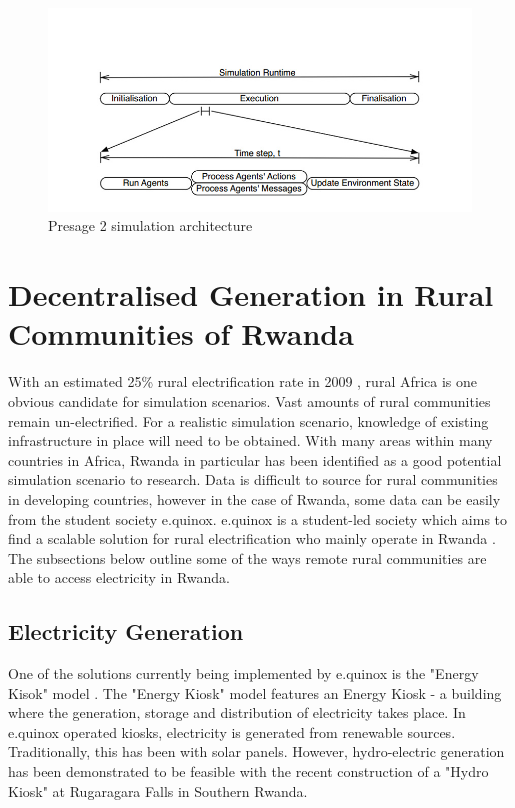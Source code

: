 \begin{figure}[h!]
	\centering
	\includegraphics[scale=0.4]{Images/Presage2.jpg}
	\caption{Presage 2 simulation architecture \cite{Presage_Kyoto:2015}}
	\label{fig:Presage_sim_architecture}
\end{figure}

\clearpage

\section*{Decentralised Generation in Rural Communities of Rwanda}
With an estimated 25\% rural electrification rate in 2009 \cite{IEA-web:2015}, rural Africa is one obvious candidate for simulation scenarios. Vast amounts of rural communities remain un-electrified. For a realistic simulation scenario, knowledge of existing infrastructure in place will need to be obtained. With many areas within many countries in Africa, Rwanda in particular has been identified as a good potential simulation scenario to research. Data is difficult to source for rural communities in developing countries, however in the case of Rwanda, some data can be easily from the student society e.quinox. e.quinox is a student-led society which aims to find a scalable solution for rural electrification who mainly operate in Rwanda \cite{e.quinox-web:2015}. The subsections below outline some of the ways remote rural communities are able to access electricity in Rwanda.

\subsection*{Electricity Generation}
One of the solutions currently being implemented by e.quinox is the "Energy Kisok" model \cite{e.quinox-EK-web:2015}. The "Energy Kiosk" model features an Energy Kiosk - a building where the generation, storage and distribution of electricity takes place.
In e.quinox operated kiosks, electricity is generated from renewable sources.
Traditionally, this has been with solar panels. However, hydro-electric generation has been demonstrated to be feasible with the recent construction of a "Hydro Kiosk" at Rugaragara Falls in Southern Rwanda.

